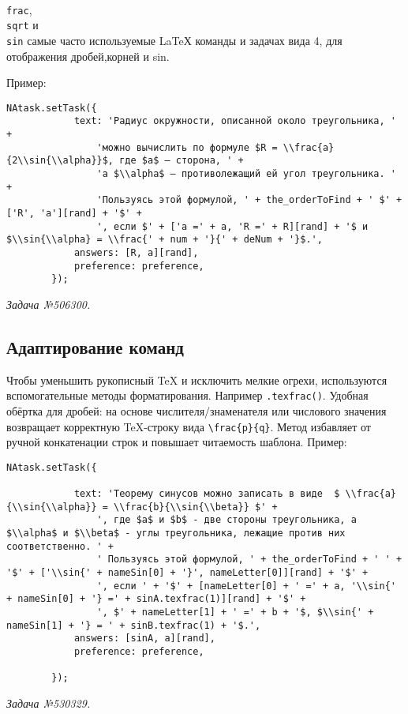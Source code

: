 \texttt{\\frac{}{}}, \texttt{\\sqrt{}} и \texttt{\\sin{}} 
самые часто используемые LaTeХ команды и задачах вида 4, для отображения дробей,корней и sin.

Пример:
\begin{lstlisting}
NAtask.setTask({
			text: 'Радиус окружности, описанной около треугольника, ' +
				'можно вычислить по формуле $R = \\frac{a}{2\\sin{\\alpha}}$, где $a$ – сторона, ' +
				'а $\\alpha$ – противолежащий ей угол треугольника. ' +
				'Пользуясь этой формулой, ' + the_orderToFind + ' $' + ['R', 'a'][rand] + '$' +
				', если $' + ['a =' + a, 'R =' + R][rand] + '$ и $\\sin{\\alpha} = \\frac{' + num + '}{' + deNum + '}$.',
			answers: [R, a][rand],
			preference: preference,
		});
\end{lstlisting}
\textsl{Задача №506300.}

\subsection{Адаптирование команд}
Чтобы уменьшить рукописный TeX и исключить мелкие огрехи, используются вспомогательные методы форматирования. Например \texttt{.texfrac()}.
Удобная обёртка для дробей: на основе числителя/знаменателя или числового значения возвращает корректную TeX-строку вида \verb|\frac{p}{q}|. 
Метод избавляет от ручной конкатенации строк и повышает читаемость шаблона.
Пример:
\begin{lstlisting}
NAtask.setTask({

			text: 'Теорему синусов можно записать в виде  $ \\frac{a}{\\sin{\\alpha}} = \\frac{b}{\\sin{\\beta}} $' +
				', где $a$ и $b$ - две стороны треугольника, а $\\alpha$ и $\\beta$ - углы треугольника, лежащие против них соответственно. ' +
				' Пользуясь этой формулой, ' + the_orderToFind + ' ' + '$' + ['\\sin{' + nameSin[0] + '}', nameLetter[0]][rand] + '$' +
				', если ' + '$' + [nameLetter[0] + ' =' + a, '\\sin{' + nameSin[0] + '} =' + sinA.texfrac(1)][rand] + '$' +
				', $' + nameLetter[1] + ' =' + b + '$, $\\sin{' + nameSin[1] + '} = ' + sinB.texfrac(1) + '$.',
			answers: [sinA, a][rand],
			preference: preference,

		});
\end{lstlisting}
\textsl{Задача №530329.}
 

